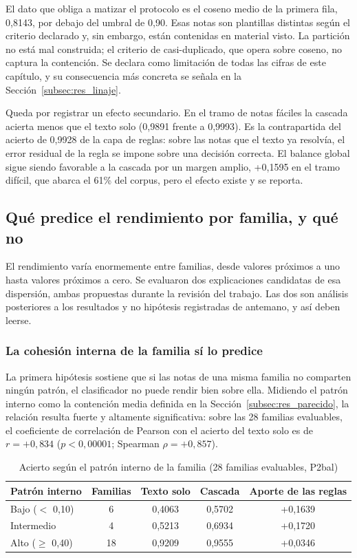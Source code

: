 El dato que obliga a matizar el protocolo es el coseno medio de la primera fila, 0,8143, por debajo del umbral de 0,90. Esas notas son plantillas distintas según el criterio declarado y, sin embargo, están contenidas en material visto. La partición no está mal construida; el criterio de casi-duplicado, que opera sobre coseno, no captura la contención. Se declara como limitación de todas las cifras de este capítulo, y su consecuencia más concreta se señala en la Sección~\ref{subsec:res_linaje}.

Queda por registrar un efecto secundario. En el tramo de notas fáciles la cascada acierta menos que el texto solo (0,9891 frente a 0,9993). Es la contrapartida del acierto de 0,9928 de la capa de reglas: sobre las notas que el texto ya resolvía, el error residual de la regla se impone sobre una decisión correcta. El balance global sigue siendo favorable a la cascada por un margen amplio, +0,1595 en el tramo difícil, que abarca el 61\% del corpus, pero el efecto existe y se reporta.


\subsection{Qué predice el rendimiento por familia, y qué no}
\label{subsec:res_predictores}

El rendimiento varía enormemente entre familias, desde valores próximos a uno hasta valores próximos a cero. Se evaluaron dos explicaciones candidatas de esa dispersión, ambas propuestas durante la revisión del trabajo. Las dos son análisis posteriores a los resultados y no hipótesis registradas de antemano, y así deben leerse.

\subsubsection*{La cohesión interna de la familia sí lo predice}

La primera hipótesis sostiene que si las notas de una misma familia no comparten ningún patrón, el clasificador no puede rendir bien sobre ella. Midiendo el patrón interno como la contención media definida en la Sección~\ref{subsec:res_parecido}, la relación resulta fuerte y altamente significativa: sobre las 28 familias evaluables, el coeficiente de correlación de Pearson con el acierto del texto solo es de $r = +0{,}834$ ($p < 0{,}00001$; Spearman $\rho = +0{,}857$).

\begin{table}[ht]
\centering
\caption{Acierto según el patrón interno de la familia (28 familias evaluables, P2bal)}
\label{tab:patron}
\begin{tabular}{|l|c|c|c|c|}
\hline
\textbf{Patrón interno} & \textbf{Familias} & \textbf{Texto solo} & \textbf{Cascada} & \textbf{Aporte de las reglas} \\
\hline
Bajo ($<$ 0,10) & 6 & 0,4063 & 0,5702 & +0,1639 \\
Intermedio & 4 & 0,5213 & 0,6934 & +0,1720 \\
Alto ($\geq$ 0,40) & 18 & 0,9209 & 0,9555 & +0,0346 \\
\hline
\end{tabular}
\end{table}

